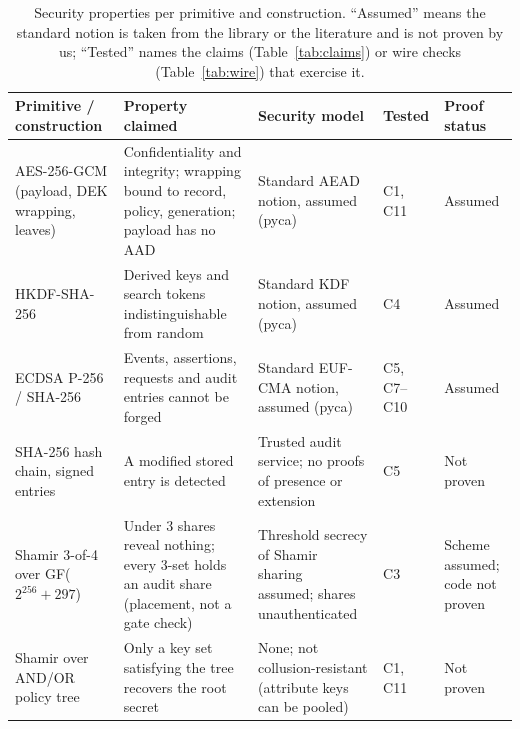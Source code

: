 \begin{table}[!t]
\centering
\footnotesize
\setlength{\tabcolsep}{3.5pt}
\caption{Security properties per primitive and construction. ``Assumed'' means
the standard notion is taken from the library or the literature and is not
proven by us; ``Tested'' names the claims (Table~\ref{tab:claims}) or wire
checks (Table~\ref{tab:wire}) that exercise it.}
\label{tab:secprops}
\begin{tabular}{@{}>{\raggedright\arraybackslash}p{} >{\raggedright\arraybackslash}p{} >{\raggedright\arraybackslash}p{} >{\raggedright\arraybackslash}p{} >{\raggedright\arraybackslash}p{}@{}}
\toprule
Primitive / construction & Property claimed & Security model & Tested & Proof status \\
\midrule
AES-256-GCM (payload, DEK wrapping, leaves) & Confidentiality and integrity; wrapping bound to record, policy, generation; payload has no AAD & Standard AEAD notion, assumed (pyca) & C1, C11 & Assumed \\ %
HKDF-SHA-256 & Derived keys and search tokens indistinguishable from random & Standard KDF notion, assumed (pyca) & C4 & Assumed \\ %
ECDSA P-256 / SHA-256 & Events, assertions, requests and audit entries cannot be forged & Standard EUF-CMA notion, assumed (pyca) & C5, C7--C10 & Assumed \\ %
SHA-256 hash chain, signed entries & A modified stored entry is detected & Trusted audit service; no proofs of presence or extension & C5 & Not proven \\ %
Shamir 3-of-4 over GF($2^{256}{+}297$) & Under 3 shares reveal nothing; every 3-set holds an audit share (placement, not a gate check) & Threshold secrecy of Shamir sharing~\cite{shamir1979share} assumed; shares unauthenticated & C3 & Scheme assumed; code not proven \\ %
Shamir over AND/OR policy tree & Only a key set satisfying the tree recovers the root secret & None; not collusion-resistant (attribute keys can be pooled) & C1, C11 & Not proven \\ %

\end{tabular}
\end{table}
